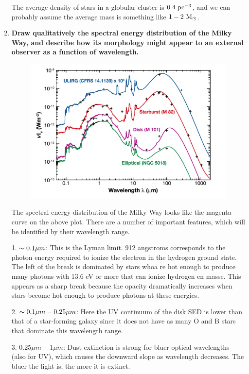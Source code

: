 \begin{enumerate}
      The average density of stars in a globular cluster is $0.4~{\rm pc}^{-3}$, and we can probably assume the average mass is something like $1-2~{\rm M}_\odot$.
\item \textbf{Draw qualitatively the spectral energy distribution of the Milky Way, and describe
      how its morphology might appear to an external observer as a function of wavelength.}
      
      \begin{figure}[!h]
\begin{center}
\includegraphics[width=\textwidth]{galaxy_sed.jpg}
\end{center}
\end{figure}

The spectral energy distribution of the Milky Way looks like the magenta curve on the above plot.  There are a number of important features, which will be identified by their wavelength range.  

1. $ \thicksim0.1 \mu m$:  This is the Lyman limit.  912 angstroms corresponds to the photon energy required to ionize the electron in the hydrogen ground state.  The left of the break is dominated by stars whoa re hot enough to produce many photons with 13.6 eV or more that can ionize hydrogen en masse.  This appears as a sharp break because the opacity dramatically increases when stars become hot enough to produce photons at these energies.  

2.  $\thicksim 0.1 \mu m - 0.25 \mu m$:  Here the UV continuum of the disk SED is lower than that of a star-forming galaxy since it does not have as many O and B stars that dominate this wavelength range.

3. $ 0.25 \mu m - 1 \mu m$:  Dust extinction is strong for bluer optical wavelengths (also for UV), which causes the downward slope as wavelength decreases.  The bluer the light is, the more it is extinct.


\end{enumerate}
